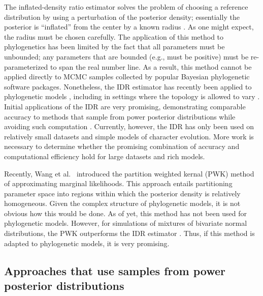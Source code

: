 The inflated-density ratio estimator solves the problem of choosing a reference
distribution by using a perturbation of the posterior density; essentially the
posterior is ``inflated'' from the center by a known radius
\citep{Petris2007,Arima2012,Arima2014}.
As one might expect, the radius must be chosen carefully.
The application of this method to phylogenetics has been limited by the fact
that all parameters must be unbounded; any parameters that are bounded (e.g.,
must be positive) must be re-parameterized to span the real number line.
As a result, this method cannot be applied directly to MCMC samples collected
by popular Bayesian phylogenetic software packages.
Nonetheless, the IDR estimator has recently been applied to phylogenetic models
\citep{Arima2014}, including in settings where the topology is allowed to vary
\citep{Wu2014}.
Initial applications of the IDR are very promising, demonstrating comparable
accuracy to methods that sample from power posterior distributions while
avoiding such computation \citep{Arima2014,Wu2014}.
Currently, however, the IDR has only been used on relatively small datasets and
simple models of character evolution.
More work is necessary to determine whether the promising combination of
accuracy and computational efficiency hold for large datasets and rich models.

Recently, Wang et al.\ \citeyear{Wang2017} introduced the partition weighted
kernal (PWK) method of approximating marginal likelihoods.
This approach entails partitioning parameter space into regions within which
the posterior density is relatively homogeneous.
Given the complex structure of phylogenetic models, it is not obvious how this
would be done.
As of yet, this method has not been used for phylogenetic models.
However, for simulations of mixtures of bivariate normal distributions, the
PWK outperforms the IDR estimator \citep{Wang2017}.
Thus, if this method is adapted to phylogenetic models, it is very promising.

\subsection{Approaches that use samples from power posterior distributions}

